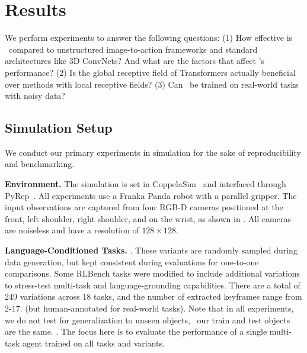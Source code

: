 \section{Results}
\vspace{-0.2cm}
We perform experiments to answer the following questions: (1) How effective is \model~compared to unstructured image-to-action frameworks and standard architectures like 3D ConvNets? And what are the factors that affect \model's performance? (2) Is the global receptive field of Transformers actually beneficial over methods with local receptive fields? (3) Can \model~be trained on real-world tasks with noisy data?

\vspace{-0.2cm}
\subsection{Simulation Setup}
\vspace{-0.2cm}

We conduct our primary experiments in simulation for the sake of reproducibility and benchmarking.

\textbf{Environment.} The simulation is set in CoppelaSim~\citep{coppelasim} and interfaced through PyRep~\citep{james2019pyrep}. All experiments use a Franka Panda robot with a parallel gripper. The input observations are captured from four RGB-D cameras positioned at the front, left shoulder, right shoulder, and on the wrist, as shown in . All cameras are noiseless and have a resolution of $128 \times 128$. 

\textbf{Language-Conditioned Tasks.}  . These variants are randomly sampled during data generation, but kept consistent during evaluations for one-to-one comparisons. 
Some RLBench tasks were modified to include additional variations to stress-test multi-task and language-grounding capabilities. 
There are a total of 249 variations across 18 tasks, and the number of extracted keyframes range from 2-17.
 (but human-annotated for real-world tasks). Note that in all experiments, we do not test for generalization to unseen objects, \ie~our train and test objects are the same. 
.
The focus here is to evaluate the performance of a single multi-task agent trained on all tasks and variants.

